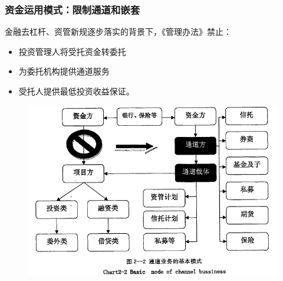 \documentclass[a4paper,12pt]{ctexbeamer}
\begin{document}
\begin{frame}
    \frametitle{资金运用模式：限制通道和嵌套}

    金融去杠杆、资管新规逐步落实的背景下，《管理办法》禁止：
    \begin{itemize}
        \item 投资管理人将受托资金转委托
        \item 为委托机构提供通道服务
        \item 受托人提供最低投资收益保证。
    \end{itemize}
    \begin{figure}[H]
        \centering
        \includegraphics[width=0.6\linewidth]{img/channel.png}
    \end{figure}

\end{frame}
\end{document}
